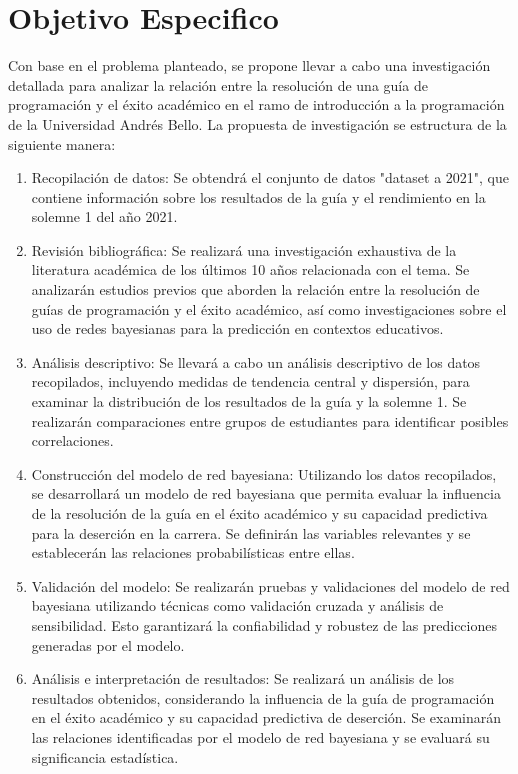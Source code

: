 \hypertarget{objetivo_especifico}{%
    \section{Objetivo Especifico}\label{Objetivo Especifico}}
    \vfill
Con base en el problema planteado, se propone llevar a cabo una investigación detallada para analizar la relación entre la resolución de una guía de programación y el éxito académico en el ramo de introducción a la programación de la Universidad Andrés Bello. La propuesta de investigación se estructura de la siguiente manera:
\vfill
\begin{enumerate}
    \item Recopilación de datos: Se obtendrá el conjunto de datos "dataset a 2021", que contiene información sobre los resultados de la guía y el rendimiento en la solemne 1 del año 2021.

    \item Revisión bibliográfica: Se realizará una investigación exhaustiva de la literatura académica de los últimos 10 años relacionada con el tema. Se analizarán estudios previos que aborden la relación entre la resolución de guías de programación y el éxito académico, así como investigaciones sobre el uso de redes bayesianas para la predicción en contextos educativos.

    \item Análisis descriptivo: Se llevará a cabo un análisis descriptivo de los datos recopilados, incluyendo medidas de tendencia central y dispersión, para examinar la distribución de los resultados de la guía y la solemne 1. Se realizarán comparaciones entre grupos de estudiantes para identificar posibles correlaciones.

    \item Construcción del modelo de red bayesiana: Utilizando los datos recopilados, se desarrollará un modelo de red bayesiana que permita evaluar la influencia de la resolución de la guía en el éxito académico y su capacidad predictiva para la deserción en la carrera. Se definirán las variables relevantes y se establecerán las relaciones probabilísticas entre ellas.

    \item Validación del modelo: Se realizarán pruebas y validaciones del modelo de red bayesiana utilizando técnicas como validación cruzada y análisis de sensibilidad. Esto garantizará la confiabilidad y robustez de las predicciones generadas por el modelo.

    \item Análisis e interpretación de resultados: Se realizará un análisis de los resultados obtenidos, considerando la influencia de la guía de programación en el éxito académico y su capacidad predictiva de deserción. Se examinarán las relaciones identificadas por el modelo de red bayesiana y se evaluará su significancia estadística.


\end{enumerate}
